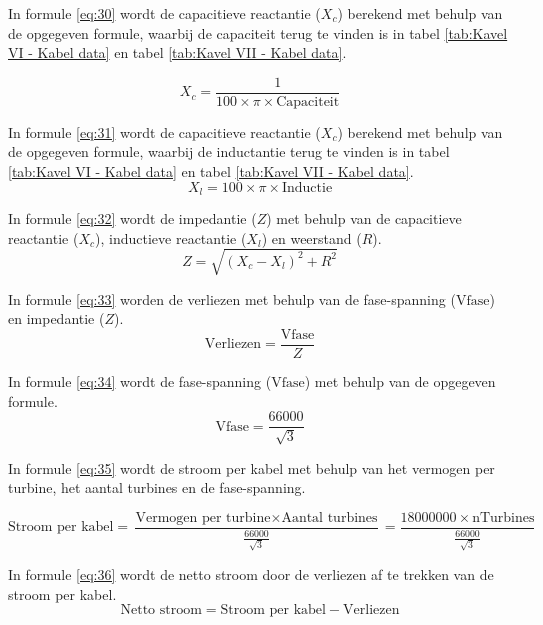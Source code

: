 In formule \ref{eq:30} wordt de capacitieve reactantie (\(X_c\)) berekend met behulp van de opgegeven formule, waarbij de capaciteit terug te vinden is in tabel \ref{tab:Kavel VI - Kabel data} en tabel \ref{tab:Kavel VII - Kabel data}.

\begin{equation} \label{eq:30}
X_c = \frac{1}{{100 \times \pi \times \text{{Capaciteit}}}}
\end{equation}


In formule \ref{eq:31} wordt de capacitieve reactantie (\(X_c\)) berekend met behulp van de opgegeven formule, waarbij de inductantie terug te vinden is in tabel \ref{tab:Kavel VI - Kabel data} en tabel \ref{tab:Kavel VII - Kabel data}.
\begin{equation} \label{eq:31}
X_l = 100 \times \pi \times \text{{Inductie}}
\end{equation}


In formule \ref{eq:32} wordt de impedantie (\(Z\)) met behulp van de capacitieve reactantie (\(X_c\)), inductieve reactantie (\(X_l\)) en weerstand (\(R\)).
\begin{equation} \label{eq:32}
Z = \sqrt{{(X_c - X_l)^2 + R^2}}
\end{equation}



In formule \ref{eq:33} worden de verliezen met behulp van de fase-spanning (\(\text{{Vfase}}\)) en impedantie (\(Z\)).
\begin{equation} \label{eq:33}
\text{{Verliezen}} = \frac{{\text{{Vfase}}}}{{Z}}
\end{equation}



In formule \ref{eq:34} wordt de fase-spanning (\(\text{{Vfase}}\)) met behulp van de opgegeven formule.
\begin{equation} \label{eq:34}
\text{{Vfase}} = \frac{{66000}}{{\sqrt{3}}}
\end{equation}



In formule \ref{eq:35} wordt de stroom per kabel met behulp van het vermogen per turbine, het aantal turbines en de fase-spanning.

\begin{equation} \label{eq:35}
\text{{Stroom per kabel}} = \frac{{\text{{Vermogen per turbine}} \times \text{{Aantal turbines}}}}{{\frac{{66000}}{{\sqrt{3}}}}} = \frac{{18000000 \times \text{{nTurbines}}}}{{\frac{{66000}}{{\sqrt{3}}}}}
\end{equation}


In formule \ref{eq:36} wordt de netto stroom door de verliezen af te trekken van de stroom per kabel.
\begin{equation} \label{eq:36}
\text{{Netto stroom}} = \text{{Stroom per kabel}} - \text{{Verliezen}}
\end{equation}
